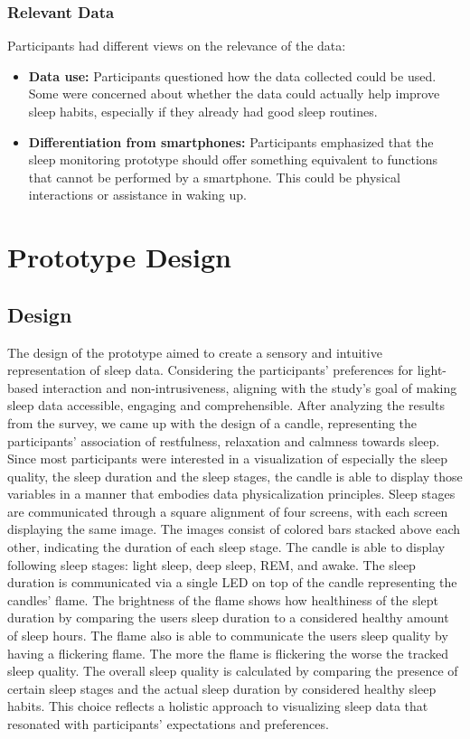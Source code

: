 \documentclass[
  a4paper,  %
  twoside,  %
  bibliography=totoc,
  headsepline,
  cleardoublepage=empty,
  parskip=half,
  draft=false
]{scrbook}
\begin{document}
\subsection{Relevant Data}
Participants had different views on the relevance of the data:
\begin{itemize}
    \item \textbf{Data use:} Participants questioned how the data collected could be used. Some were concerned about whether the data could actually help improve sleep habits, especially if they already had good sleep routines.
    \item \textbf{Differentiation from smartphones:} Participants emphasized that the sleep monitoring prototype should offer something equivalent to functions that cannot be performed by a smartphone. This could be physical interactions or assistance in waking up.
\end{itemize}



\chapter{Prototype Design}

\section{Design}
The design of the prototype aimed to create a sensory and intuitive representation of sleep data. Considering the participants' preferences for light-based interaction and non-intrusiveness, aligning with the study's goal of making sleep data accessible, engaging and comprehensible. After analyzing the results from the survey, we came up with the design of a candle, representing the participants' association of restfulness, relaxation and calmness towards sleep. Since most participants were interested in a visualization of especially the sleep quality, the sleep duration and the sleep stages, the candle is able to display those variables in a manner that embodies data physicalization principles. Sleep stages are communicated through a square alignment of four screens, with each screen displaying the same image. The images consist of colored bars stacked above each other, indicating the duration of each sleep stage. The candle is able to display following sleep stages: light sleep, deep sleep, REM, and awake. The sleep duration is communicated via a single LED on top of the candle representing the candles' flame. The brightness of the flame shows how healthiness of the slept duration by comparing the users sleep duration to a considered healthy amount of sleep hours. The flame also is able to communicate the users sleep quality by having a flickering flame. The more the flame is flickering the worse the tracked sleep quality. The overall sleep quality is calculated by comparing the presence of certain sleep stages and the actual sleep duration by considered healthy sleep habits. This choice reflects a holistic approach to visualizing sleep data that resonated with participants' expectations and preferences.
\end{document}
